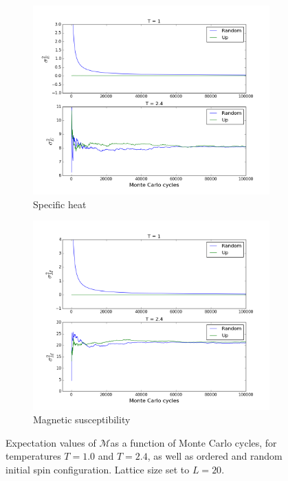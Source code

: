 \documentclass{article}
\begin{document}
\begin{figure}[H]
  \centering
  \begin{subfigure}{0.49\textwidth}
    \includegraphics[scale=0.29]{../figures/task_c/sigmaE.png}
    \caption{Specific heat}
  \end{subfigure}
  \begin{subfigure}{0.49\textwidth}
    \includegraphics[scale=0.29]{../figures/task_c/sigmaM.png}
    \caption{Magnetic susceptibility}
  \end{subfigure}
  \caption{Expectation values of $\mathcal{M}$as a function of Monte Carlo cycles, for temperatures $T=1.0$ and $T=2.4$, as well as ordered and random initial spin configuration. Lattice size set to $L=20$.}
  \label{fig:imploder}
\end{figure}
\end{document}
